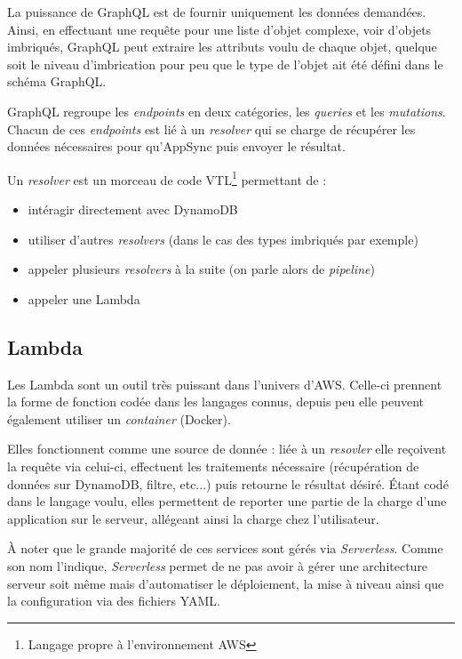 \documentclass[12pt,a4paper,oneside]{scrreprt}
\begin{document}
La puissance de GraphQL est de fournir uniquement les données demandées. Ainsi, en effectuant une requête pour une liste d'objet complexe, voir d'objets imbriqués, GraphQL peut extraire les attributs voulu de chaque objet, quelque soit le niveau d'imbrication pour peu que le type de l'objet ait été défini dans le schéma GraphQL.

GraphQL regroupe les \textit{endpoints} en deux catégories, les \textit{queries} et les \textit{mutations}. Chacun de ces \textit{endpoints} est lié à un \textit{resolver} qui se charge de récupérer les données nécessaires pour qu'AppSync puis envoyer le résultat.

Un \textit{resolver} est un morceau de code VTL\footnote{Langage propre à l'environnement AWS} permettant de :
\begin{itemize}
	\item intéragir directement avec DynamoDB
	\item utiliser d'autres \textit{resolvers} (dans le cas des types imbriqués par exemple)
	\item appeler plusieurs \textit{resolvers} à la suite (on parle alors de \textit{pipeline})
	\item appeler une Lambda
\end{itemize}

\subsection*{Lambda}

Les Lambda sont un outil très puissant dans l'univers d'AWS. Celle-ci prennent la forme de fonction codée dans les langages connus, depuis peu elle peuvent également utiliser un \textit{container} (Docker).

Elles fonctionnent comme une source de donnée : liée à un \textit{resovler} elle reçoivent la requête via celui-ci, effectuent les traitements nécessaire (récupération de données sur DynamoDB, filtre, etc...) puis retourne le résultat désiré. Étant codé dans le langage voulu, elles permettent de reporter une partie de la charge d'une application sur le serveur, allégeant ainsi la charge chez l'utilisateur.

\begin{info}
	À noter que le grande majorité de ces services sont gérés via \textit{Serverless}. Comme son nom l'indique, \textit{Serverless} permet de ne pas avoir à gérer une architecture serveur soit même mais d'automatiser le déploiement, la mise à niveau ainsi que la configuration via des fichiers YAML.
\end{info}
\end{document}
